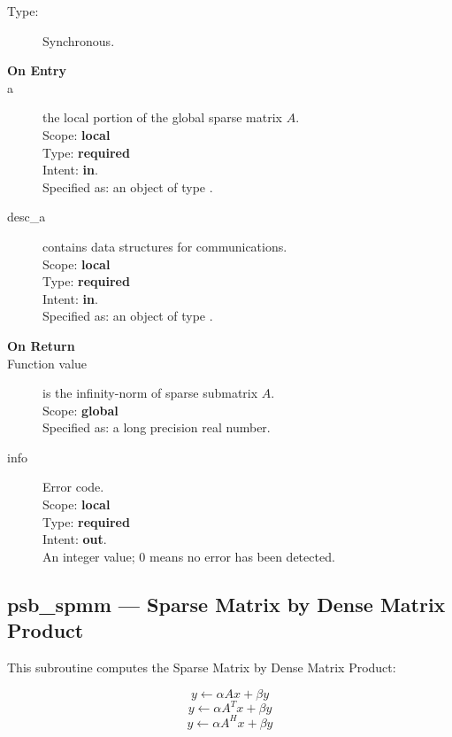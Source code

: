 \begin{description}
\item[Type:] Synchronous.
\item[\bf On Entry]
\item[a] the local  portion of the global sparse matrix
$A$. \\
Scope: {\bf local} \\
Type: {\bf required}\\
Intent: {\bf in}.\\
Specified as: an object of type \spdata.
\item[desc\_a] contains data structures for communications.\\
Scope: {\bf local} \\
Type: {\bf required}\\
Intent: {\bf in}.\\
Specified as: an object of type \descdata.
\item[\bf On Return]
\item[Function value] is the infinity-norm of sparse submatrix $A$.\\
Scope: {\bf global} \\
Specified as: a long precision real number.
\item[info] Error code.\\
Scope: {\bf local} \\
Type: {\bf required} \\
Intent: {\bf out}.\\
An integer value; 0 means no error has been detected.
\end{description}


%
%


\clearpage\subsection{psb\_spmm --- Sparse Matrix by Dense Matrix
  Product}

This subroutine computes the Sparse Matrix by Dense Matrix Product:

\begin{equation}
y \leftarrow \alpha  A  x + \beta y
\label{eq:f90spmm_no_tra}
\end{equation}
\begin{equation}
y \leftarrow \alpha  A^T x + \beta y
\label{eq:f90spmm_tra}
\end{equation}
\begin{equation}
y \leftarrow \alpha  A^H  x + \beta y
\label{eq:f90spmm_con}
\end{equation}


